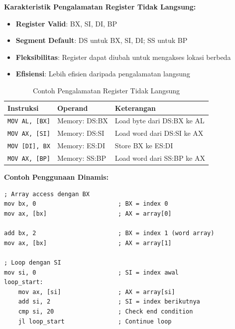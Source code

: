 \documentclass[../main.tex]{subfiles}
\begin{document}
\textbf{Karakteristik Pengalamatan Register Tidak Langsung:}
\begin{itemize}
    \item \textbf{Register Valid}: BX, SI, DI, BP
    \item \textbf{Segment Default}: DS untuk BX, SI, DI; SS untuk BP
    \item \textbf{Fleksibilitas}: Register dapat diubah untuk mengakses lokasi berbeda
    \item \textbf{Efisiensi}: Lebih efisien daripada pengalamatan langsung
\end{itemize}

\begin{table}[H]
    \centering
    \caption{Contoh Pengalamatan Register Tidak Langsung}
    \begin{tabular}{|p{3.5cm}|p{3.5cm}|p{6.5cm}|}
        \hline
        \textbf{Instruksi} & \textbf{Operand} & \textbf{Keterangan} \\
        \hline
        \texttt{MOV AL, [BX]} & Memory: DS:BX & Load byte dari DS:BX ke AL \\
        \hline
        \texttt{MOV AX, [SI]} & Memory: DS:SI & Load word dari DS:SI ke AX \\
        \hline
        \texttt{MOV [DI], BX} & Memory: ES:DI & Store BX ke ES:DI \\
        \hline
        \texttt{MOV AX, [BP]} & Memory: SS:BP & Load word dari SS:BP ke AX \\
        \hline
    \end{tabular}
    \label{tab:indirect-register-addressing-examples}
\end{table}

\textbf{Contoh Penggunaan Dinamis:}
\begin{lstlisting}[language={[x86masm]Assembler}, caption=Penggunaan Dinamis Register untuk Array Access, label=lst:dynamic-usage]
; Array access dengan BX
mov bx, 0                       ; BX = index 0
mov ax, [bx]                    ; AX = array[0]

add bx, 2                       ; BX = index 1 (word array)
mov ax, [bx]                    ; AX = array[1]

; Loop dengan SI
mov si, 0                       ; SI = index awal
loop_start:
    mov ax, [si]                ; AX = array[si]
    add si, 2                   ; SI = index berikutnya
    cmp si, 20                  ; Check end condition
    jl loop_start               ; Continue loop
\end{lstlisting}
\end{document}
